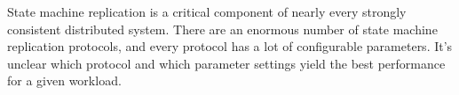 State machine replication is a critical component of nearly every strongly
consistent distributed system. There are an enormous number of state machine
replication protocols, and every protocol has a lot of configurable parameters.
It's unclear which protocol and which parameter settings yield the best
performance for a given workload.

